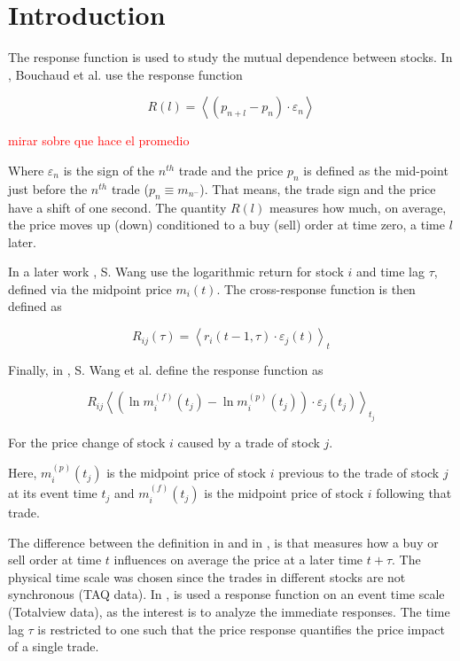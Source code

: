 \section{Introduction}

The response function is used to study the mutual dependence between stocks. In
\cite{Bouchaud_2004}, Bouchaud et al. use the response function

\begin{equation}\label{eq:Bouchaud_2004}
    R\left(l\right)=\left\langle \left(p_{n+l}-p_{n}\right) \cdot
    \varepsilon_{n}\right\rangle
\end{equation}

\textcolor{red}{mirar sobre que hace el promedio}

Where $\varepsilon_{n}$ is the sign of the $n^{th}$ trade and the price $p_n$ is defined as the
mid-point just before the $n^{th}$ trade ($p_{n} \equiv m_{n^{-}}$). That means, the trade sign
and the price have a shift of one second.
The quantity $R\left(l\right)$ measures how much, on average, the price moves up (down) conditioned
to a buy (sell) order at time zero, a time $l$ later.

In a later work \cite{Wang_2016_cross}, S. Wang use the logarithmic return for stock $i$
and time lag $\tau$, defined via the midpoint price $m_{i} \left( t \right)$. The cross-response
function is then defined as

\begin{equation}\label{eq:Wang_2016}
    R_{ij}\left(\tau\right)=\left\langle r_{i}\left(t-1,\tau\right)\cdot\varepsilon_{j}
    \left(t\right) \right\rangle _{t}
\end{equation}

Finally, in \cite{Wang_2018_b}, S. Wang et al. define the response function as

\begin{equation}\label{eq:Wang_2018_b}
    R_{ij}\left\langle \left(\ln m_{i}^{\left(f\right)}\left(t_{j}\right)-\ln m_{i}^{\left(p\right)}
    \left(t_{j}\right) \right)\cdot\varepsilon_{j}\left(t_{j}\right)\right\rangle _{t_{j}}
\end{equation}

For the price change of stock $i$ caused by a trade of stock $j$.

Here, $m_{i}^{\left(p\right)}\left(t_{j}\right)$ is the midpoint price of stock $i$ previous to
the trade of stock $j$ at its event time $t_j$ and $m_{i}^{\left(f\right)}\left(t_{j}\right)$ is
the midpoint price of stock $i$ following that trade.

The difference between the definition in \cite{Wang_2016_cross} and in \cite{Wang_2018_b}, is that
\cite{Wang_2016_cross} measures how a buy or sell order at time $t$ influences on average the price
at a later time $t + \tau$. The physical time scale was chosen since the trades in different stocks
are not synchronous (TAQ data).
In \cite{Wang_2018_b}, is used a response function on an event time scale (Totalview data), as the
interest is to analyze the immediate responses. The time lag $\tau$ is restricted to one such that
the price response quantifies the price impact of a single trade.